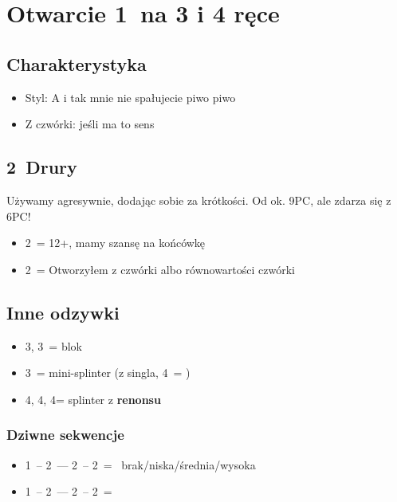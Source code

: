 \documentclass[12pt, a4paper]{article}
\begin{document}
\pagebreak
\section{Otwarcie 1\major\ na 3 i 4 ręce}
\subsection*{Charakterystyka}
\begin{itemize}
    \item Styl: A i tak mnie nie spałujecie piwo piwo
    \item Z czwórki: jeśli ma to sens
\end{itemize}

\subsection*{2\clubs\ Drury}
Używamy agresywnie, dodając sobie za krótkości. Od ok. 9PC, ale zdarza się z 6PC!
\begin{itemize}
    \item 2\diams\ = 12+, mamy szansę na końcówkę
    \item 2\major\ = Otworzyłem z czwórki albo równowartości czwórki
\end{itemize}

\subsection*{Inne odzywki} 
\begin{itemize}
    \item 3\hearts, 3\spades\ = blok
    \item 3\nt\ = mini-splinter (z singla, 4\clubs\ = \lsf)
    \item 4\clubs, 4\diams, 4\hearts = splinter z \textbf{renonsu}
\end{itemize}

\subsubsection*{Dziwne sekwencje}
\begin{itemize}
    \item 1\spades\ -- 2\clubs\ --- 2\diams\ -- 2\nt\ = \lsf\ brak/niska/średnia/wysoka \imp
    \item 1\hearts\ -- 2\clubs\ --- 2\diams\ -- 2\spades\ = \lsf
\end{itemize}



\pagebreak
\end{document}
